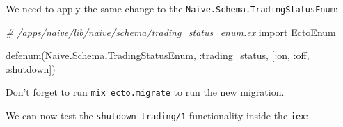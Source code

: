 \documentclass[
]{book}
\newenvironment{Shaded}{\begin{snugshade}}{\end{snugshade}}
\newcommand{\CommentTok}[1]{\textcolor[rgb]{0.56,0.35,0.01}{\textit{#1}}}
\newcommand{\ConstantTok}[1]{\textcolor[rgb]{0.00,0.00,0.00}{#1}}
\newcommand{\ImportTok}[1]{#1}
\newcommand{\NormalTok}[1]{#1}
\newcommand{\OperatorTok}[1]{\textcolor[rgb]{0.81,0.36,0.00}{\textbf{#1}}}
\newcommand{\VariableTok}[1]{\textcolor[rgb]{0.00,0.00,0.00}{#1}}
\begin{document}
We need to apply the same change to the \texttt{Naive.Schema.TradingStatusEnum}:

\begin{Shaded}
\begin{Highlighting}[]
\CommentTok{\# /apps/naive/lib/naive/schema/trading\_status\_enum.ex}
\ImportTok{import} \ConstantTok{EctoEnum}

\NormalTok{defenum(}\ConstantTok{Naive}\OperatorTok{.}\ConstantTok{Schema}\OperatorTok{.}\ConstantTok{TradingStatusEnum}\NormalTok{, }\VariableTok{:trading\_status}\NormalTok{, [}\VariableTok{:on}\NormalTok{, }\VariableTok{:off}\NormalTok{, }\VariableTok{:shutdown}\NormalTok{])}
\end{Highlighting}
\end{Shaded}

Don't forget to run \texttt{mix\ ecto.migrate} to run the new migration.

We can now test the \texttt{shutdown\_trading/1} functionality inside the \texttt{iex}:
\end{document}

